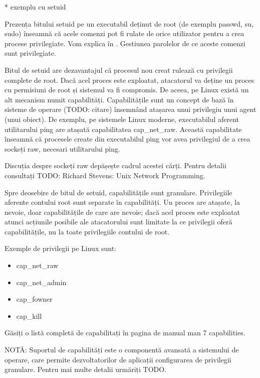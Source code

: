 * exemplu cu setuid

Prezența bitului setuid pe un executabil deținut de root (de exemplu passwd, su,
sudo) înseamnă că acele comenzi pot fi rulate de orice utilizator pentru a crea
procese privilegiate. Vom explica în .
Gestiunea parolelor de ce aceste comenzi sunt privilegiate.

Bitul de setuid are dezavantajul că procesul nou creat rulează cu privilegii
complete de root. Dacă acel proces este exploatat, atacatorul va deține un
proces cu permisiuni de root și sistemul va fi compromis. De aceea, pe Linux
există un alt mecanism numit capabilități. Capabilitățile sunt un concept de
bază în sisteme de operare (TODO: citare) însemnând atașarea unui privilegiu
unui agent (unui obiect). De exemplu, pe sistemele Linux moderne, executabilul
aferent utilitarului ping are atașată capabilitatea cap_net_raw. Această
capabilitate înseamnă că procesele create din executabilul ping vor avea
privilegiul de a crea sockeți raw, necesari utilitarului ping.

\begin{note}[NOTĂ]

Discuția despre sockeți raw depășește cadrul acestei cărți. Pentru detalii
consultați TODO: Richard Stevens: Unix Network Programming.

\end{note}

Spre deosebire de bitul de setuid, capabilitățile sunt granulare. Privilegiile
aferente contului root sunt separate în capabilități. Un proces are atașate, la
nevoie, doar capabilitățile de care are nevoie; dacă acel proces este exploatat
atunci acțiunile posibile ale atacatorului sunt limitate la ce privilegii oferă
capabilitățile, nu la toate privilegiile contului de root.

Exemple de privilegii pe Linux sunt:

\begin{itemize}
	\item cap_net_raw
	\item cap_net_admin
	\item cap_fowner
	\item cap_kill
\end{itemize}

Găsiți o listă completă de capabilitați în pagina de manual man 7 capabilities.

NOTĂ: Suportul de capabilități este o componentă avansată a sistemului de
operare, care permite dezvoltatorilor de aplicații configurarea de privilegii
granulare. Pentru mai multe detalii urmăriți TODO.

